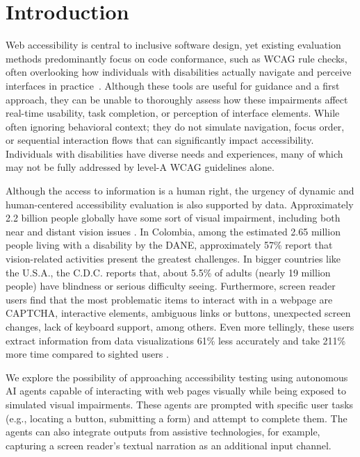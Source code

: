 
\section{Introduction}

Web accessibility is central to inclusive software design, yet existing evaluation methods predominantly focus on code conformance, such as \ac{WCAG} rule checks, often overlooking how individuals with disabilities actually navigate and perceive interfaces in practice~\cite{ara2024inclusive}. Although these tools are useful for guidance and a first approach, they can be unable to thoroughly assess how these impairments affect real-time usability, task completion, or perception of interface elements. While often ignoring behavioral context; they do not simulate navigation, focus order, or sequential interaction flows that can significantly impact accessibility. Individuals with disabilities have diverse needs and experiences, many of which may not be fully addressed by level-A \ac{WCAG} guidelines alone.

Although the access to information is a human right, the urgency of dynamic and human-centered accessibility evaluation is also supported by data. Approximately 2.2 billion people globally have some sort of visual impairment, including both near and distant vision issues \cite{who2023vision}. In Colombia, among the estimated 2.65 million people living with a disability by the DANE, approximately 57\% report that vision-related activities present the greatest challenges\cite{DANE2022}. In bigger countries like the U.S.A., the C.D.C. reports that, about 5.5\% of adults (nearly 19 million people) have blindness or serious difficulty seeing\cite{cdc2025disabilities}. Furthermore, screen reader users find that the most problematic items to interact with in a webpage are CAPTCHA, interactive elements, ambiguous links or buttons, unexpected screen changes, lack of keyboard support, among others\cite{webaimsurvey2025}. Even more tellingly, these users extract information from data visualizations 61\% less accurately and take 211\% more time compared to sighted users \cite{wobbrock2021assets}.

We explore the possibility of approaching accessibility testing using autonomous \ac{AI} agents capable of interacting with web pages visually while being exposed to simulated visual impairments. These agents are prompted with specific user tasks (e.g., locating a button, submitting a form) and attempt to complete them. The agents can also integrate outputs from assistive technologies, for example, capturing a screen reader's textual narration as an additional input channel. 

